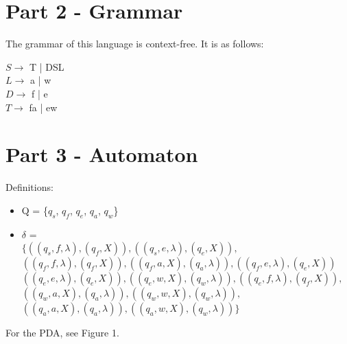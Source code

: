 \documentclass{article}
\begin{document}
\section{Part 2 - Grammar}
The grammar of this language is context-free. It is as follows:
\begin{center}
    $S\rightarrow$ T | DSL \\
    $L\rightarrow$ a | w\\
    $D \rightarrow$ f | e \\
    $T \rightarrow$ fa | ew
\end{center}
\section{Part 3 - Automaton}
Definitions: 
\begin{center}
    \begin{itemize}
        \item Q = \{$q_s$, $q_f$, $q_e$, $q_a$, $q_w$\}
        \item $\delta$ =\\ $\{
        ((q_s,f, \lambda), (q_f,X)),
        ((q_s,e, \lambda), (q_e,X)),$\\
        $((q_f,f, \lambda), (q_f,X)),
        ((q_f,a, X), (q_a,\lambda)),
        ((q_f,e, \lambda), (q_e,X))$\\
        $((q_e,e, \lambda), (q_e,X)),
        ((q_e,w, X), (q_w,\lambda)),
        ((q_e,f, \lambda), (q_f,X)),$\\
        $((q_w,a, X), (q_a,\lambda)),
        ((q_w,w, X), (q_w,\lambda)),$\\
        $((q_a,a, X), (q_a,\lambda)),
        ((q_a,w, X), (q_w,\lambda))
        \}$
    \end{itemize}
\end{center}
For the PDA, see Figure 1. 
\end{document}
